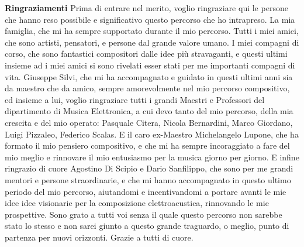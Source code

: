 \vfill
\LARGE \textbf{Ringraziamenti} \normalsize \newline \newline
Prima di entrare nel merito, voglio ringraziare qui le persone
che hanno reso possibile e significativo questo percorso che ho intrapreso.
La mia famiglia, che mi ha sempre supportato durante il mio percorso.
Tutti i miei amici, che sono artisti, pensatori, e persone dal grande valore umano.
I miei compagni di corso, che sono fantastici compositori dalle idee più stravaganti,
e questi ultimi insieme ad i miei amici si sono rivelati esser
stati per me importanti compagni di vita.
Giuseppe Silvi, che mi ha accompagnato e guidato in questi ultimi anni sia da maestro
che da amico, sempre amorevolmente nel mio percorso compositivo,
ed insieme a lui, voglio ringraziare tutti i grandi Maestri e Professori
del dipartimento di Musica Elettronica,
a cui devo tanto del mio percorso, della mia crescita e del mio operato:
Pasquale Citera, Nicola Bernardini, Marco Giordano, Luigi Pizzaleo, Federico Scalas.
E il caro ex-Maestro Michelangelo Lupone, che ha formato il mio pensiero compositivo,
e che mi ha sempre incoraggiato a fare del mio meglio e rinnovare il mio entusiasmo
per la musica giorno per giorno.
E infine ringrazio di cuore Agostino Di Scipio e Dario Sanfilippo,
che sono per me grandi mentori e persone straordinarie,
e che mi hanno accompagnato in questo ultimo periodo del mio percorso,
aiutandomi e incentivandomi a portare avanti le
mie idee idee visionarie per la composizione elettroacustica,
rinnovando le mie prospettive.
Sono grato a tutti voi senza il quale questo percorso non sarebbe stato lo stesso
e non sarei giunto a questo grande traguardo,
o meglio, punto di partenza per nuovi orizzonti.
Grazie a tutti di cuore.
